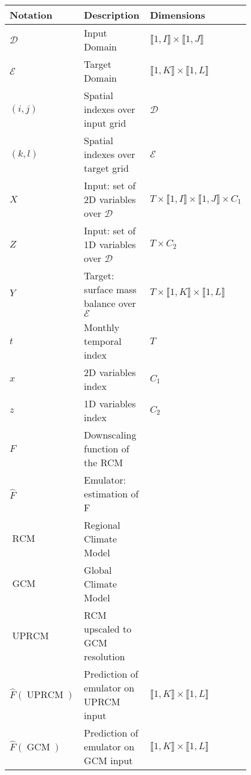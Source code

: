 \begin{table}[!tbp]
    \centering
    \caption{}
    \renewcommand\arraystretch{1.2}
    \begin{tabular}{l>{\raggedright\arraybackslash}p{0.4\linewidth}>{\raggedright\arraybackslash}p{0.4\linewidth}}
    \toprule
        \textbf{Notation} & \textbf{Description} & \textbf{Dimensions} \\ \toprule 
        $\mathcal{D}$ & Input Domain & $\llbracket 1, I \rrbracket \times \llbracket 1, J \rrbracket$   \\
        $\mathcal{E}$ & Target Domain & $\llbracket 1, K \rrbracket \times \llbracket 1, L \rrbracket$   \\
        $(i,j)$ & Spatial indexes over
        input grid & $\mathcal{D}$   \\
        $(k,l)$ & Spatial indexes over
        target grid & $\mathcal{E}$   \\
        $X$ & Input: set of 2D variables over $\mathcal{D}$ & $T \times \llbracket 1, I \rrbracket \times \llbracket 1, J \rrbracket \times C_1$   \\
        $Z$ & Input: set of 1D variables over $\mathcal{D}$ & $T \times C_2$   \\
        $Y$ & Target: surface mass balance over $\mathcal{E}$ & $T \times \llbracket 1, K \rrbracket \times \llbracket 1, L \rrbracket$  \\
        $t$ & Monthly temporal index & $T$   \\
        $x$ & 2D variables index & $C_1$   \\
        $z$ & 1D variables index & $C_2$ 
        \\
        $F$ & Downscaling function of the RCM & 
        \\
        $\hat{F}$ & Emulator: estimation of F & 
        \\
         $\operatorname{RCM}$ & Regional Climate Model & 
        \\
         $\operatorname{GCM}$ & Global Climate Model & 
        \\
        $\operatorname{UPRCM}$ &  RCM upscaled to GCM resolution & 
        \\
        $\hat{F}(\operatorname{UPRCM})$ & Prediction of emulator on UPRCM input & $\llbracket 1, K \rrbracket \times \llbracket 1, L \rrbracket$
        \\
        $\hat{F}(\operatorname{GCM})$ & Prediction of emulator on GCM input & $\llbracket 1, K \rrbracket \times \llbracket 1, L \rrbracket$
        \\
\bottomrule
    \end{tabular}
            \label{tab:notations}
\end{table}